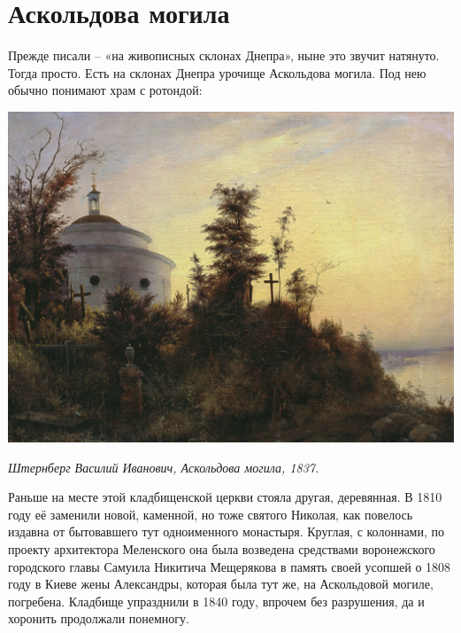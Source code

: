 \chapter{Аскольдова могила}

Прежде писали – «на живописных склонах Днепра», ныне это звучит натянуто. Тогда просто. Есть на склонах Днепра урочище Аскольдова могила. Под нею обычно понимают храм с ротондой:

\begin{center}
\includegraphics[width=\linewidth]{chast-volga/oskoldidir/ascoldova_mogila_1837.jpg}

\textit{Штернберг Василий Иванович, Аскольдова могила, 1837.}
\end{center}

Раньше на месте этой кладбищенской церкви стояла другая, деревянная. В 1810 году её заменили новой, каменной, но тоже святого Николая, как повелось издавна от бытовавшего тут одноименного монастыря. Круглая, с колоннами, по проекту архитектора Меленского она была возведена средствами воронежского городского главы Самуила Никитича Мещерякова в память своей усопшей о 1808 году в Киеве жены Александры, которая была тут же, на Аскольдовой могиле, погребена. Кладбище упразднили в 1840 году, впрочем без разрушения, да и хоронить продолжали понемногу.

